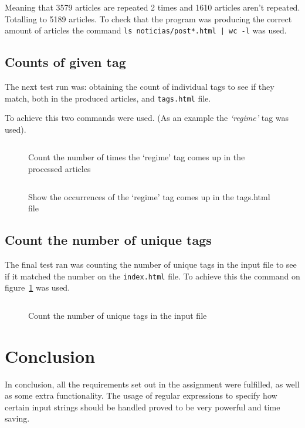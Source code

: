 \documentclass[a4paper]{report}
\begin{document}
Meaning that 3579 articles are repeated 2 times and 1610 articles aren't
repeated. Totalling to 5189 articles. To check that the program was producing
the correct amount of articles the command
\verb!ls noticias/post*.html | wc -l! was used.

\section{Counts of given tag}

The next test run was: obtaining the count of individual tags to see if they
match, both in the produced articles, and \texttt{tags.html} file.

To achieve this two commands were used. (As an example the \textit{`regime'}
tag was used).

\begin{figure}[H]
    \inputminted{bash}{./test_count_regime_posts.sh}
    \caption{Count the number of times the `regime' tag comes up in the
    processed articles}
\end{figure}

\begin{figure}[H]
    \inputminted{bash}{./test_count_regime_tags.sh}
    \caption{Show the occurrences of the `regime' tag comes up in the tags.html
    file}
\end{figure}

\section{Count the number of unique tags}

The final test ran was counting the number of unique tags in the input file to
see if it matched the number on the \texttt{index.html} file. To achieve this
the command on figure~\ref{fig:test_count_unique_tags} was used.

\begin{figure}[H]
    \inputminted{bash}{test_count_unique_tags.sh}
    \caption{Count the number of unique tags in the input
    file}\label{fig:test_count_unique_tags}
\end{figure}

\chapter{Conclusion}

In conclusion, all the requirements set out in the assignment were fulfilled, as
well as some extra functionality. The usage of regular expressions to specify
how certain input strings should be handled proved to be very powerful and time
saving.
\end{document}
